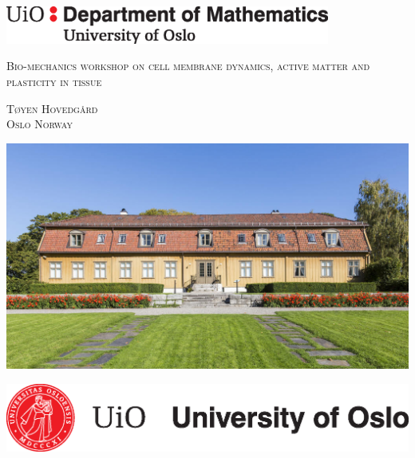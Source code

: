 \documentclass{article}
\begin{document}
\newenvironment{changemargin}[2]{%
\begin{list}{}{%
\setlength{\topsep}{0pt}%
\setlength{\leftmargin}{#1}%
\setlength{\rightmargin}{#2}%
\setlength{\listparindent}{\parindent}%
\setlength{\itemindent}{\parindent}%
\setlength{\parsep}{\parskip}%
}%
\item[]}{\end{list}}

\begin{titlepage}
	\centering
	\includegraphics[width=0.8\textwidth]{img/mat-mn-navn-eng.eps}\par\vspace{1cm}
	{\scshape\LARGE Bio-mechanics workshop on cell membrane dynamics, active matter and plasticity in tissue \par}
	\vspace{1cm}
	{\scshape\Large Tøyen Hovedgård \\ Oslo Norway\par}
	\vspace{1.5cm}

\begin{changemargin}{-1cm}{-1cm}

\includegraphics[scale=0.4]{img/hoved.jpg}

\centering
\vspace{0.5cm}
\vspace{0.5cm}



\includegraphics[scale=0.45]{img/UiO_Seal_B_ENG_cmyk.eps}\hspace*{2cm}
\end{changemargin}

	\vfill


\end{titlepage}
\end{document}
